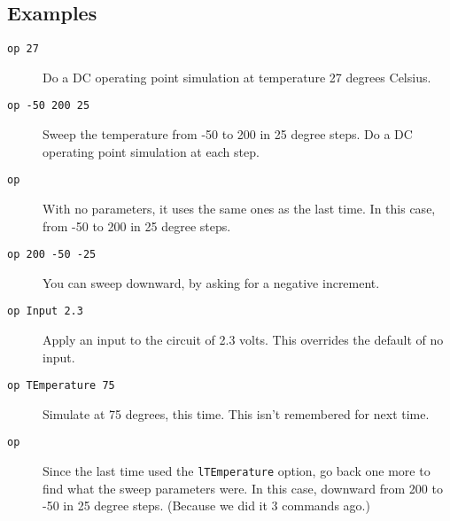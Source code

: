 \subsection{Examples}

\begin{description}

\item[{\tt op 27}] Do a DC operating point simulation at temperature 27
degrees Celsius.

\item[{\tt op -50 200 25}] Sweep the temperature from -50 to 200 in 25
degree steps.  Do a DC operating point simulation at each step.

\item[{\tt op}] With no parameters, it uses the same ones as the last time.
In this case, from -50 to 200 in 25 degree steps.

\item[{\tt op 200 -50 -25}] You can sweep downward, by asking for a negative
increment.

\item[{\tt op Input 2.3}] Apply an input to the circuit of 2.3 volts.  This
overrides the default of no input.

\item[{\tt op TEmperature 75}] Simulate at 75 degrees, this time.  This isn't
remembered for next time.

\item[{\tt op}] Since the last time used the {\tt lTEmperature} option, go
back one more to find what the sweep parameters were.  In this case, downward
from 200 to -50 in 25 degree steps.  (Because we did it 3 commands ago.)

\end{description}
